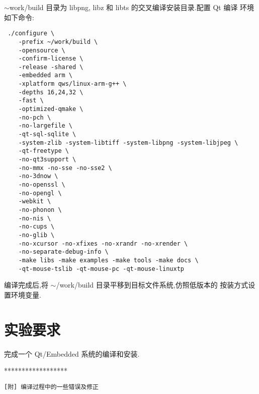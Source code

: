 $\sim$work/build 目录为 libpng, libz 和 libts 的交叉编译安装目录.配置 Qt 编译
环境如下命令:

\begin{verbatim}
 ./configure \
    -prefix ~/work/build \
    -opensource \
    -confirm-license \
    -release -shared \
    -embedded arm \
    -xplatform qws/linux-arm-g++ \
    -depths 16,24,32 \
    -fast \
    -optimized-qmake \
    -no-pch \
    -no-largefile \
    -qt-sql-sqlite \
    -system-zlib -system-libtiff -system-libpng -system-libjpeg \
    -qt-freetype \
    -no-qt3support \
    -no-mmx -no-sse -no-sse2 \
    -no-3dnow \
    -no-openssl \
    -no-opengl \
    -webkit \
    -no-phonon \
    -no-nis \
    -no-cups \
    -no-glib \
    -no-xcursor -no-xfixes -no-xrandr -no-xrender \
    -no-separate-debug-info \
    -make libs -make examples -make tools -make docs \
    -qt-mouse-tslib -qt-mouse-pc -qt-mouse-linuxtp
\end{verbatim}

编译完成后,将 $\sim$/work/build 目录平移到目标文件系统,仿照低版本的
按装方式设置环境变量.


\section{实验要求}
	完成一个 Qt/Embedded 系统的编译和安装.
\newpage
\begin{center} ****************** \end{center}
\tt [附] 编译过程中的一些错误及修正

